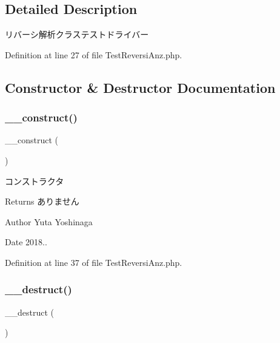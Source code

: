 \subsection{Detailed Description}
リバーシ解析クラステストドライバー 

Definition at line 27 of file Test\+Reversi\+Anz.\+php.



\subsection{Constructor \& Destructor Documentation}
\mbox{\label{class_test_reversi_anz_a095c5d389db211932136b53f25f39685}} 
\subsubsection{\texorpdfstring{\+\_\+\+\_\+construct()}{\_\_construct()}}
{\footnotesize\ttfamily \+\_\+\+\_\+construct (\begin{DoxyParamCaption}{ }\end{DoxyParamCaption})}



コンストラクタ 

\begin{DoxyReturn}{Returns}
ありません 
\end{DoxyReturn}
\begin{DoxyAuthor}{Author}
Yuta Yoshinaga 
\end{DoxyAuthor}
\begin{DoxyDate}{Date}
2018.. 
\end{DoxyDate}


Definition at line 37 of file Test\+Reversi\+Anz.\+php.

\mbox{\label{class_test_reversi_anz_a421831a265621325e1fdd19aace0c758}} 
\subsubsection{\texorpdfstring{\+\_\+\+\_\+destruct()}{\_\_destruct()}}
{\footnotesize\ttfamily \+\_\+\+\_\+destruct (\begin{DoxyParamCaption}{ }\end{DoxyParamCaption})}



